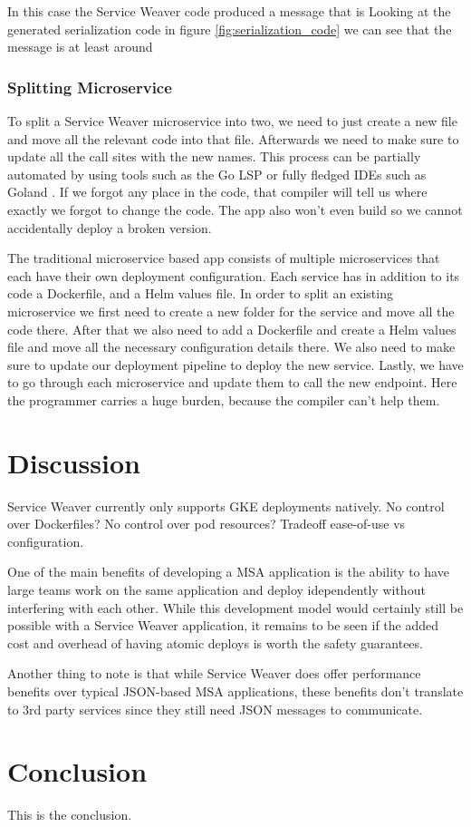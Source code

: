\documentclass[sigconf,review,9pt]{acmart}
\begin{document}
In this case the Service Weaver code produced a message that is
Looking at the generated serialization code in figure \ref{fig:serialization_code}
we can see that the message is at least around

\subsubsection{Splitting Microservice}

To split a Service Weaver microservice into two, we need to just create a new
file and move all the relevant code into that file.
Afterwards we need to make sure to update all the call sites with the new names.
This process can be partially automated by using tools such as the Go LSP or
fully fledged IDEs such as Goland \cite{goland}.
If we forgot any place in the code, that compiler will tell us where exactly we
forgot to change the code.
The app also won't even build so we cannot accidentally deploy a broken version.

The traditional microservice based app consists of multiple microservices that each
have their own deployment configuration.
Each service has \textemdash in addition to its code \textemdash a Dockerfile, and a Helm
values file.
In order to split an existing microservice we first need to create a new folder
for the service and move all the code there.
After that we also need to add a Dockerfile and create a Helm values file and move
all the necessary configuration details there.
We also need to make sure to update our deployment pipeline to deploy the new
service.
Lastly, we have to go through each microservice and update them to call the new endpoint.
Here the programmer carries a huge burden, because the compiler can't help them.

\section{Discussion}
Service Weaver currently only supports GKE deployments natively.
No control over Dockerfiles?
No control over pod resources?
Tradeoff ease-of-use vs configuration.

One of the main benefits of developing a MSA application is the ability to
have large teams work on the same application and deploy idependently without
interfering with each other. \cite{what}
While this development model would certainly still be possible with a Service Weaver
application, it remains to be seen if the added cost and overhead of having atomic
deploys is worth the safety guarantees.

Another thing to note is that while Service Weaver does offer performance benefits
over typical JSON-based MSA applications, these benefits don't translate to 3rd party
services since they still need JSON messages to communicate.

\section{Conclusion}
This is the conclusion.



\end{document}
